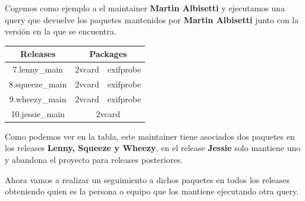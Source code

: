 \documentclass[a4paper, 12pt]{book}
\begin{document}
Cogemos como ejemplo a el maintainer \textbf{Martin Albisetti} y ejecutamos una query que devuelve los paquetes mantenidos por \textbf{Martin Albisetti} junto con la versión en la que se encuentra.

\begin{table}[h]
	\begin{tabular}{|c|cc|}
		\hline
		\rowcolor[HTML]{FFFE65} 
		Releases        & \multicolumn{2}{c|}{\cellcolor[HTML]{FFFE65}Packages} \\ \hline
		7.lenny\_main   & \multicolumn{1}{c|}{2vcard}        & exifprobe        \\ \hline
		8.squeeze\_main & \multicolumn{1}{c|}{2vcard}        & exifprobe        \\ \hline
		9.wheezy\_main  & \multicolumn{1}{c|}{2vcard}        & exifprobe        \\ \hline
		10.jessie\_main & \multicolumn{2}{c|}{2vcard}                           \\ \hline
	\end{tabular}
\end{table}

Como podemos ver en la tabla, este maintainer tiene asociados dos paquetes en los releases \textbf{Lenny, Squeeze y Wheezy}, en el release \textbf{Jessie} solo mantiene uno y abandona el proyecto para releases posteriores.

Ahora vamos a realizar un seguimiento a dichos paquetes en todos los releases obteniendo quien es la persona o equipo que los mantiene ejecutando otra query.
 
\end{document}
